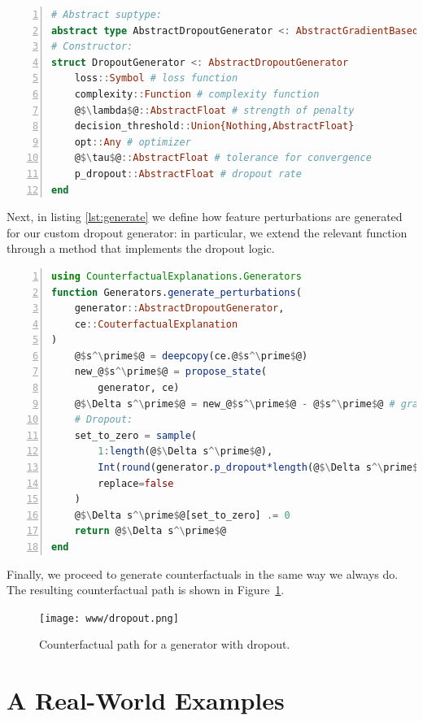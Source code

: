 \documentclass{juliacon}
\begin{document}
\begin{lstlisting}[language=Julia, escapechar=@, numbers=left, label={lst:dropout}, caption={}]
# Abstract suptype:
abstract type AbstractDropoutGenerator <: AbstractGradientBasedGenerator end
# Constructor:
struct DropoutGenerator <: AbstractDropoutGenerator
    loss::Symbol # loss function
    complexity::Function # complexity function
    @$\lambda$@::AbstractFloat # strength of penalty
    decision_threshold::Union{Nothing,AbstractFloat} 
    opt::Any # optimizer
    @$\tau$@::AbstractFloat # tolerance for convergence
    p_dropout::AbstractFloat # dropout rate
end
\end{lstlisting}

Next, in listing \ref{lst:generate} we define how feature perturbations
are generated for our custom dropout generator: in particular, we extend
the relevant function through a method that implements the dropout
logic.

\begin{lstlisting}[language=Julia, escapechar=@, numbers=left, label={lst:generate}, caption={}]
using CounterfactualExplanations.Generators
function Generators.generate_perturbations(
    generator::AbstractDropoutGenerator, 
    ce::CouterfactualExplanation
)
    @$s^\prime$@ = deepcopy(ce.@$s^\prime$@)
    new_@$s^\prime$@ = propose_state(
        generator, ce)
    @$\Delta s^\prime$@ = new_@$s^\prime$@ - @$s^\prime$@ # gradient step
    # Dropout:
    set_to_zero = sample(
        1:length(@$\Delta s^\prime$@),
        Int(round(generator.p_dropout*length(@$\Delta s^\prime$@))),
        replace=false
    )
    @$\Delta s^\prime$@[set_to_zero] .= 0
    return @$\Delta s^\prime$@
end
\end{lstlisting}

Finally, we proceed to generate counterfactuals in the same way we
always do. The resulting counterfactual path is shown in
Figure~\ref{fig-dropout}.

\begin{figure}

{\centering \texttt{[image: www/dropout.png]}

}

\caption{\label{fig-dropout}Counterfactual path for a generator with
dropout.}

\end{figure}

\hypertarget{sec-emp}{%
\section{A Real-World Examples}\label{sec-emp}}
\end{document}
